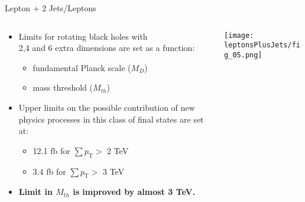 \documentclass[8pt]{beamer}
\begin{document}
\begin{frame}{\large Lepton + 2 Jets/Leptons}
 
\begin{columns}
 \begin{column}{6cm}
    \begin{itemize}
      \item Limits for rotating black holes with \\2,4 and 6 extra dimensions are set as a function:
      \vspace{0.2cm}
      \begin{itemize}
      \item fundamental Planck scale ($M_D$)
      \vspace{0.2cm}
      \item mass threshold ($M_{th}$)
      \end{itemize}
      \vspace{0.2cm}
      \item  Upper limits on the possible contribution of new physics processes 
      in this class of final states are set at:
      \begin{itemize}
       \item 12.1 fb for $\sum p_\mathrm{T} >$ 2 TeV
       \item 3.4 fb for $\sum p_\mathrm{T} >$ 3 TeV
      \end{itemize}
      \vspace{0.2cm}
      \item \textbf{Limit in $M_{th}$ is improved by almost 3 TeV.}
      
    \end{itemize}
 \end{column}
 \begin{column}{6cm}
  \texttt{[image: leptonsPlusJets/fig\_05.png]}\\
 \end{column}
\end{columns}
\end{frame}
\end{document}
